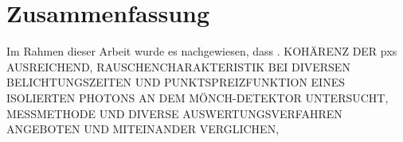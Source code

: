 \chapter{Zusammenfassung}
Im Rahmen dieser Arbeit wurde es nachgewiesen, dass . KOHÄRENZ DER \gls{pxs} AUSREICHEND, RAUSCHENCHARAKTERISTIK BEI DIVERSEN BELICHTUNGSZEITEN UND PUNKTSPREIZFUNKTION EINES ISOLIERTEN PHOTONS AN DEM MÖNCH-DETEKTOR UNTERSUCHT, MESSMETHODE UND DIVERSE AUSWERTUNGSVERFAHREN ANGEBOTEN UND MITEINANDER VERGLICHEN, 